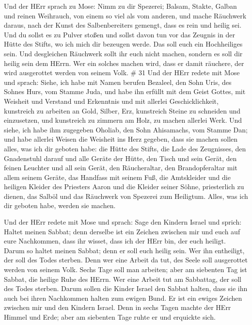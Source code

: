  Und der HErr sprach zu Mose: Nimm zu dir Spezerei; Balsam,
Stakte, Galban und reinen Weihrauch, von einem so viel als vom anderen,
 und mache Räuchwerk daraus, nach der Kunst des
Salbenbereiters gemengt, dass es rein und heilig sei.  Und
du sollst es zu Pulver stoßen und sollst davon tun vor das Zeugnis in
der Hütte des Stifts, wo ich mich dir bezeugen werde. Das soll euch ein
Hochheiliges sein.  Und desgleichen Räuchwerk sollt ihr
euch nicht machen, sondern es soll dir heilig sein dem HErrn.
 Wer ein solches machen wird, dass er damit räuchere, der
wird ausgerottet werden von seinem Volk. \# 31  Und der HErr
redete mit Mose und sprach:  Siehe, ich habe mit Namen
berufen Bezaleel, den Sohn Uris, des Sohnes Hurs, vom Stamme Juda,
 und habe ihn erfüllt mit dem Geist Gottes, mit Weisheit und
Verstand und Erkenntnis und mit allerlei Geschicklichkeit, 
kunstreich zu arbeiten an Gold, Silber, Erz,  kunstreich
Steine zu schneiden und einzusetzen, und kunstreich zu zimmern am Holz,
zu machen allerlei Werk.  Und siehe, ich habe ihm zugegeben
Oholiab, den Sohn Ahisamachs, vom Stamme Dan; und habe allerlei Weisen
die Weisheit ins Herz gegeben, dass sie machen sollen alles, was ich dir
geboten habe:  die Hütte des Stifts, die Lade des
Zeugnisses, den Gnadenstuhl darauf und alle Geräte der Hütte,
 den Tisch und sein Gerät, den feinen Leuchter und all sein
Gerät, den Räucheraltar,  den Brandopferaltar mit allem
seinem Geräte, das Handfass mit seinem Fuß,  die
Amtskleider und die heiligen Kleider des Priesters Aaron und die Kleider
seiner Söhne, priesterlich zu dienen,  das Salböl und das
Räuchwerk von Spezerei zum Heiligtum. Alles, was ich dir geboten habe,
werden sie machen.

 Und der HErr redete mit Mose und sprach: 
Sage den Kindern Israel und sprich: Haltet meinen Sabbat; denn derselbe
ist ein Zeichen zwischen mir und euch auf eure Nachkommen, dass ihr
wisset, dass ich der HErr bin, der euch heiligt.  Darum so
haltet meinen Sabbat; denn er soll euch heilig sein. Wer ihn entheiligt,
der soll des Todes sterben. Denn wer eine Arbeit da tut, des Seele soll
ausgerottet werden von seinem Volk.  Sechs Tage soll man
arbeiten; aber am siebenten Tag ist Sabbat, die heilige Ruhe des HErrn.
Wer eine Arbeit tut am Sabbattag, der soll des Todes sterben.
 Darum sollen die Kinder Israel den Sabbat halten, dass sie
ihn auch bei ihren Nachkommen halten zum ewigen Bund.  Er
ist ein ewiges Zeichen zwischen mir und den Kindern Israel. Denn in
sechs Tagen machte der HErr Himmel und Erde; aber am siebenten Tage
ruhte er und erquickte sich.

